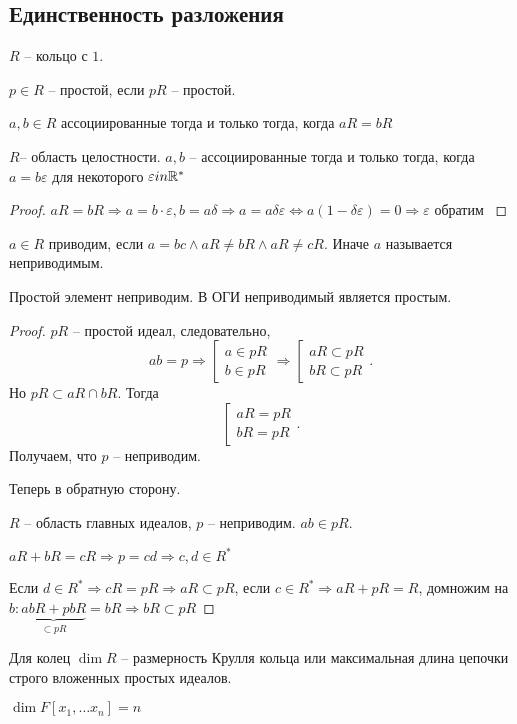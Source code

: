 \documentclass[12pt]{report}
\begin{document}
\subsection{Единственность разложения}
$ R$ -- кольцо с $ 1$.
 \begin{defn}
    $ p \in R$ -- простой, если $ pR$ -- простой.
\end{defn}
\begin{defn}
    $ a, b \in  R$ ассоциированные тогда и только тогда, когда $ aR = bR$
\end{defn}
\begin{lm}
    $ R $-- область целостности. $ a, b$ -- ассоциированные тогда и только тогда, когда  $ a = b \varepsilon $ для некоторого $ \varepsilon  in \mathbb{R}^{*}$
\end{lm}
\begin{proof}
    $ aR = bR \Rightarrow a = b \cdot \varepsilon , b = a \delta  \Rightarrow a = a \delta  \varepsilon  \Leftrightarrow a (1- \delta  \varepsilon ) = 0 \Rightarrow \varepsilon  \text{ обратим }$
\end{proof}
\begin{defn}
    $ a \in R$ приводим, если $ a = bc \wedge aR \ne bR \wedge  aR \ne cR$. Иначе $ a$ называется неприводимым.
\end{defn}
\begin{lm}
    Простой элемент неприводим. В ОГИ неприводимый является простым.
\end{lm}
\begin{proof}
    $ pR$ -- простой идеал, следовательно,
    \[
    ab = p \Rightarrow 
    \left [
    \begin{array}{l}
	a \in  pR \\
	b \in  pR
        
    \end{array}
    \right .
    \Rightarrow 
    \left[
    \begin{array}{l}
        aR \subset pR \\
	bR \subset  pR
    \end{array}
    \right .
    .\] 
    Но $ pR \subset  aR \cap bR$. Тогда 
    \[
	\left[
	\begin{array}{l}
        aR = pR \\
	bR = pR
    \end{array}
    \right.
    .\] 
    Получаем, что $ p$ -- неприводим.

    Теперь в обратную сторону.

    $ R$ -- область главных идеалов, $ p $ -- неприводим. $ ab \in  pR$.

    $ aR + bR = cR \Longrightarrow p = cd \Longrightarrow c, d \in  R^{*}$

    Если $ d \in  R^{*} \Longrightarrow cR = pR \Longrightarrow aR \subset pR$, если $ c \in  R^{*} \Longrightarrow  aR +pR = R$, домножим на $ b: \underbrace{abR + pbR }_ { \subset   pR}= bR \Longrightarrow  bR \subset pR$
\end{proof}
\begin{defn}
    Для колец $ \dim R$ --  размерность Крулля кольца или максимальная длина цепочки строго вложенных простых идеалов.
\end{defn}
\begin{ex}
    $ \dim F[x_1, \ldots x_n] = n$
\end{ex}
\end{document}
